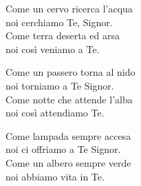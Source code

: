 
\strofa Come un cervo ricerca l'acqua\\
noi cerchiamo Te, Signor.\\
Come terra deserta ed arsa\\
noi così veniamo a Te.

\spazio

 

\spazio

\strofa Come un passero torna al nido\\
noi torniamo a Te Signor.\\
Come notte che attende l'alba\\
noi così attendiamo Te.

\spazio


\spazio

\strofa Come lampada sempre accesa\\
noi ci offriamo a Te Signor.\\
Come un albero sempre verde\\
noi abbiamo vita in Te.

\spazio

